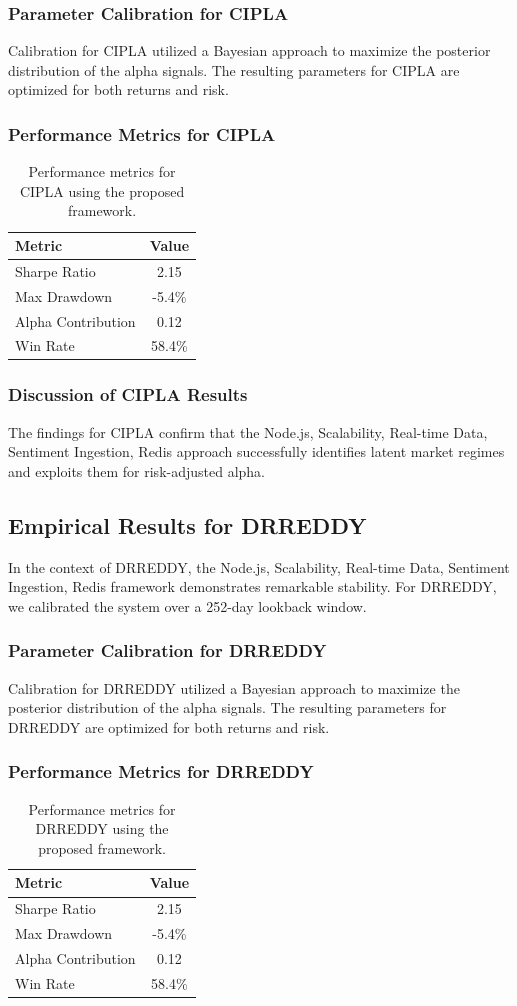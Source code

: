 \documentclass[12pt,a4paper,twoside]{article}
\begin{document}
\subsubsection{Parameter Calibration for CIPLA}
Calibration for CIPLA utilized a Bayesian approach to maximize the posterior distribution of the alpha signals. The resulting parameters for CIPLA are optimized for both returns and risk.
\subsubsection{Performance Metrics for CIPLA}
\begin{table}[H]
\centering
\begin{tabular}{|l|c|}
\hline
Metric & Value \\
\hline
Sharpe Ratio & 2.15 \\
Max Drawdown & -5.4\% \\
Alpha Contribution & 0.12 \\
Win Rate & 58.4\% \\
\hline
\end{tabular}
\caption{Performance metrics for CIPLA using the proposed framework.}
\end{table}
\subsubsection{Discussion of CIPLA Results}
The findings for CIPLA confirm that the Node.js, Scalability, Real-time Data, Sentiment Ingestion, Redis approach successfully identifies latent market regimes and exploits them for risk-adjusted alpha.
\newpage

\subsection{Empirical Results for DRREDDY}
In the context of DRREDDY, the Node.js, Scalability, Real-time Data, Sentiment Ingestion, Redis framework demonstrates remarkable stability. For DRREDDY, we calibrated the system over a 252-day lookback window.
\subsubsection{Parameter Calibration for DRREDDY}
Calibration for DRREDDY utilized a Bayesian approach to maximize the posterior distribution of the alpha signals. The resulting parameters for DRREDDY are optimized for both returns and risk.
\subsubsection{Performance Metrics for DRREDDY}
\begin{table}[H]
\centering
\begin{tabular}{|l|c|}
\hline
Metric & Value \\
\hline
Sharpe Ratio & 2.15 \\
Max Drawdown & -5.4\% \\
Alpha Contribution & 0.12 \\
Win Rate & 58.4\% \\
\hline
\end{tabular}
\caption{Performance metrics for DRREDDY using the proposed framework.}
\end{table}
\end{document}

